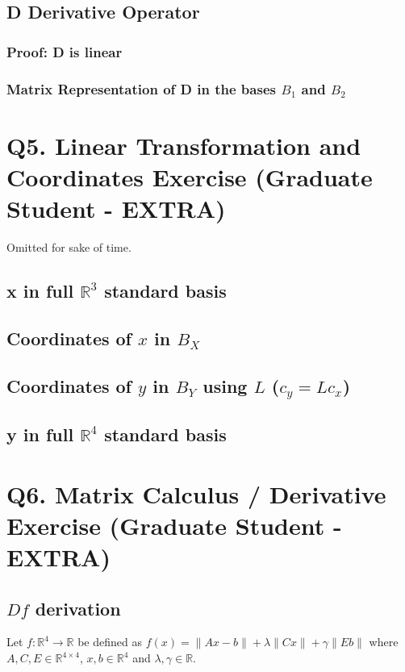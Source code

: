 \documentclass{article}
\begin{document}
    \subsection{D Derivative Operator}

    \subsubsection{Proof: D is linear}

    \subsubsection{Matrix Representation of D in the bases $B_1$ and $B_2$}

    \section{Q5. Linear Transformation and Coordinates Exercise (Graduate Student - EXTRA)}
    
    Omitted for sake of time.

    \subsection{x in full $\mathbb{R}^3$ standard basis}
    \subsection{Coordinates of $x$ in $B_X$}
    \subsection{Coordinates of $y$ in $B_Y$ using $L$ ($c_y = Lc_x$)}
    \subsection{y in full $\mathbb{R}^4$ standard basis}


    \section{Q6. Matrix Calculus / Derivative Exercise (Graduate Student - EXTRA)}
    \subsection{ $Df$ derivation }
    Let $f: \mathbb{R}^4 \rightarrow \mathbb{R}$ be defined as $f(x) = \| Ax - b \| + \lambda \| Cx \| + \gamma \| Eb \|$ where $A, C, E \in \mathbb{R}^{4 \times 4}$, $x,b \in \mathbb{R}^4$ and $\lambda,\gamma \in \mathbb{R}$.
\end{document}
